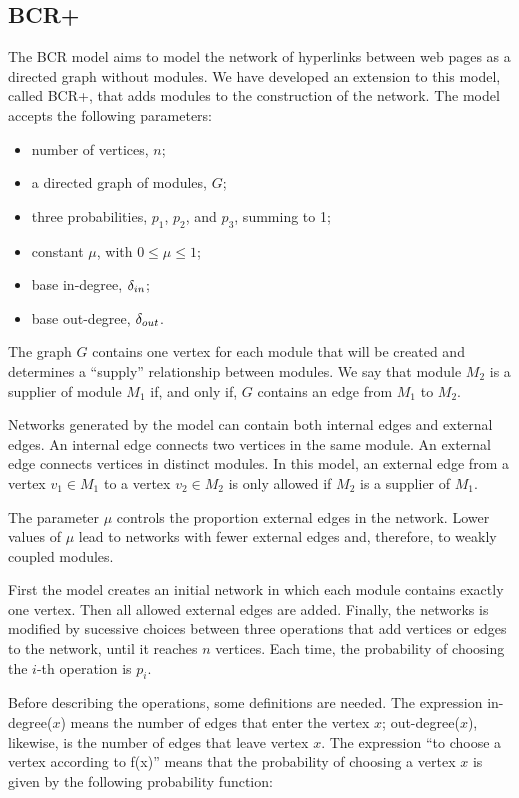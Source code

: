 \subsection{BCR+}

The BCR model \cite{Bollobas2003} aims to model the network of hyperlinks
between web pages as a directed graph without modules. We have developed an
extension to this model, called BCR+, that adds modules to the construction of
the network. The model accepts the following parameters:

\begin{itemize}
\item number of vertices, $n$;
\item a directed graph of modules, $G$;
\item three probabilities, $p_1$, $p_2$, and $p_3$, summing to 1;
\item constant $\mu$, with $0 \le \mu \le 1$;
\item base in-degree, $\delta_{in}$;
\item base out-degree, $\delta_{out}$.
\end{itemize}

The graph $G$ contains one vertex for each module that will be created and
determines a ``supply'' relationship between modules. We say that module $M_2$
is a supplier of module $M_1$ if, and only if, $G$ contains an edge from $M_1$
to $M_2$.  

Networks generated by the model can contain both internal edges and external
edges. An internal edge connects two vertices in the same module. An external
edge connects vertices in distinct modules. In this model, an external edge from
a vertex $v_1 \in M_1$ to a vertex $v_2 \in M_2$ is only allowed if $M_2$ is a
supplier of $M_1$.

The parameter $\mu$ controls the proportion external edges in the network. Lower
values of $\mu$ lead to networks with fewer external edges and, therefore, to
weakly coupled modules.

First the model creates an initial network in which each module contains exactly
one vertex. Then all allowed external edges are added. Finally, the networks is
modified by sucessive choices between three operations that add vertices or
edges to the network, until it reaches $n$ vertices. Each time, the probability
of choosing the $i$-th operation is $p_i$.

Before describing the operations, some definitions are needed. The expression
in-degree($x$) means the number of edges that enter the vertex $x$;
out-degree($x$), likewise, is the number of edges that leave vertex $x$. The
expression ``to choose a vertex according to f(x)'' means that the probability
of choosing a vertex $x$ is given by the following probability function:

